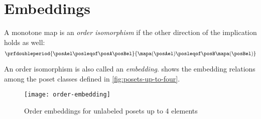 
\section{Embeddings}

\begin{ctdefinition}
    A monotone map is an \emph{order isomorphism} if the other direction of the implication holds as well:
    \begin{equation}
        \prfdoubleperiod{\posAel \posleqof\posA \posBel}{\mapa(\posAel) \posleqof\posB \mapa(\posBel)}
    \end{equation}
\end{ctdefinition}

An order isomorphism is also called an \emph{embedding}.
 shows the embedding relations among the poset classes
defined in \cref{fig:posets-up-to-four}.

\begin{figure*}
	\texttt{[image: order-embedding]}
	\caption{Order embeddings for unlabeled posets up to 4 elements}
	\label{fig:order-embedding}
\end{figure*}
